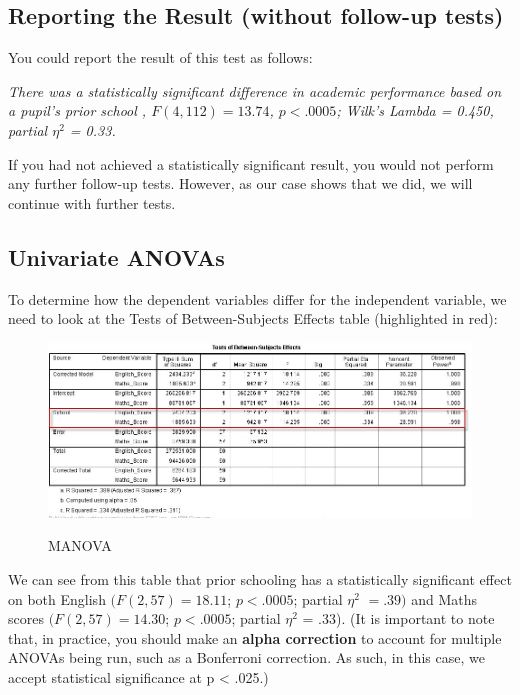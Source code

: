 \documentclass[12pt]{article} %
\begin{document}
\subsection{Reporting the Result (without follow-up tests)}
You could report the result of this test as follows:

\emph{
There was a statistically significant difference in academic performance based on a pupil's prior school , $F(4, 112) = 13.74$, $p < .0005$; Wilk's Lambda = 0.450, partial $\eta^2$ = 0.33.
}

If you had not achieved a statistically significant result, you would not perform any further follow-up tests. However, as our case shows that we did, we will continue with further tests.





\subsection{Univariate ANOVAs}
To determine how the dependent variables differ for the independent variable, we need to look at the Tests of Between-Subjects Effects table (highlighted in red):

\begin{center}
\begin{figure}[h!]
  \includegraphics[scale=0.5]{MANOVA9}\\
  \caption{MANOVA}
\end{figure}
\end{center}

We can see from this table that prior schooling has a statistically significant effect on both English $(F (2, 57) = 18.11$; $p < .0005$; partial $\eta^2$ $= .39)$ and Maths scores $(F (2, 57) = 14.30$; $p < .0005$; partial $\eta^2$ = .33).
(It is important to note that, in practice, you should make an \textbf{alpha correction} to account for multiple ANOVAs being run, such as a Bonferroni correction. As such, in this case, we accept statistical significance at p < .025.)
\end{document}
